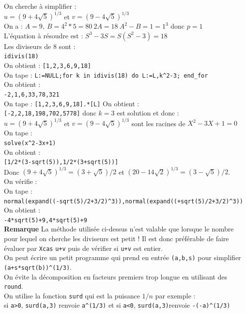 \documentclass[a4paper,11pt]{book}
\begin{document}
On cherche \`a simplifier :\\
$u=(9+4\sqrt 5)^{1/3}$ et $v=(9-4\sqrt 5)^{1/3}$\\
On a : $A=9,\ B=4^2*5=80 \ 2A=18 \ A^2-B=1=1^3$ donc $p=1$\\
L'\'equation \`a r\'esoudre est : $S^3-3S=S(S^2-3)=18$\\
Les diviseurs de 8 sont :\\
{\tt idivis(18)}\\
On obtient :
{\tt [1,2,3,6,9,18]}\\
On tape :
{\tt L:=NULL;for k in  idivis(18) do L:=L,k\verb|^|2-3; end\_for}\\
On obtient :\\
{\tt -2,1,6,33,78,321}\\
On tape :
{\tt [1,2,3,6,9,18].*[L]}
On obtient :\\
{\tt [-2,2,18,198,702,5778]}
donc $k=3$ est solution et donc :\\
$u=(9+4\sqrt 5)^{1/3}$ et $v=(9-4\sqrt 5)^{1/3}$ sont les racines de 
$X^2-3X+1=0$
On tape :\\
{\tt solve(x\verb|^|2-3x+1)}\\
On obtient :\\
{\tt [1/2*(3-sqrt(5)),1/2*(3+sqrt(5))]}\\
Donc $(9+4\sqrt 5)^{1/3}=(3+\sqrt 5)/2$ et $(20-14\sqrt 2)^{1/3}=(3-\sqrt 5)/2$.\\
On v\'erifie :\\
On tape :\\
{\tt normal(expand((-sqrt(5)/2+3/2)\verb|^|3)),normal(expand((+sqrt(5)/2+3/2)\verb|^|3))}
On obtient :\\
{\tt -4*sqrt(5)+9,4*sqrt(5)+9}\\
{\bf Remarque} La m\'ethode utilis\'ee ci-dessus n'est valable que lorsque le 
nombre pour lequel on cherche les diviseurs est petit ! Il est donc 
pr\'ef\'erable de faire \'evaluer par {\tt Xcas} {\tt u+v} puis de v\'erifier 
si {\tt u+v} est entier.\\
On peut \'ecrire un petit programme qui prend en entr\'ee {\tt (a,b,s)} pour 
simplifier  {\tt (a+s*sqrt(b))\verb|^|(1/3)}.\\
On \'evite la d\'ecomposition en facteurs premiers trop longue en utilisant 
des {\tt round}.\\
On utilise la fonction {\tt surd} qui est la puisance $1/n$ par exemple :\\
si {\tt a>0}, {\tt surd(a,3)}  renvoie {\tt a\verb|^|(1/3)} et
si {\tt a<0}, {\tt surd(a,3)}renvoie {\tt -(-a)\verb|^|(1/3)}\\
\end{document}
